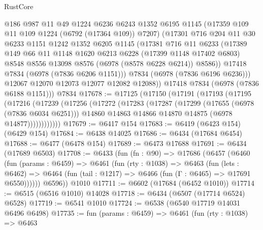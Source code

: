 \begin{lexlean}{RustCore}
\begin{coremodule}
            @186
            @987
            @11
            @49
            @1224
            @6236
            @6243
            @1352
            @6195
            @1145
            (@17359 @109 @11 @109 @1224 (@6792 (@17364 @109)) @7207)
            (@17301
              @716
              @204
              @11
              @30
              @6233
              @1151
              @1242
              @1352
              @6205
              @1145
              (@17381
                @716
                @11
                @6233
                (@17389
                  @149
                  @66
                  @11
                  @1148
                  @1620
                  @6213
                  @6228
                  (@17399 @1148 @17402 @6803)
                  @8548
                  @8556
                  @13098
                  @8576
                  (@6978 (@8578 @6228 @6214))
                  @8586))
              @17418
              @7834
              (@6978 (@7836 @6206 @1151)))
            @7834
            (@6978 (@7836 @6196 @6236)))
          @12067
          @12070
          @12073
          @12077
          @12082
          @12088))
      @17418
      @7834
      (@6978 (@7836 @6188 @1151)))
    @7834
@17678 := @17125
    (@17150
      (@17191
        (@17193
          (@17195
            (@17216
              (@17239
                (@17256
                  (@17272
                    (@17283
                      (@17287
                        (@17299
                          (@17655 (@6978 (@7836 @6034 @6251)))
                          @14860
                          @14863
                          @14866
                          @14870
                          @14875
                          (@6978 @14877))))))))))))
@17679 := @6417 @154
@17683 := @6419 (@6423 @154) (@6429 @154)
@17684 := @6438 @14025
@17686 := @6434 (@17684 @6454)
@17688 := @6477 (@6478 @154)
@17689 := @6473 @17688
@17691 := @6434 (@17689 @6503)
@17708 := @6433
    (fun (fn : @90) =>
    @17686
      (@6457
        (@6460
          (fun (params : @6459) =>
          @6461
            (fun (rty : @1038) =>
            @6463
              (fun (lets : @6462) =>
              @6464 (fun (tail : @1217) => @6466 (fun (Γ : @6465) => @17691 @6550))))))
        @6596))
    @1010
@17711 := @6602 (@17684 (@6452 @1010))
@17714 := @6515 (@6516 @1010) @14028
@17718 := @6434 (@6507 (@17714 @6524) @6528)
@17719 := @6541 @1010
@17724 := @6538 (@6540 @17719 @14031 @6496 @6498)
@17735 := fun (params : @6459) =>
  @6461
    (fun (rty : @1038) =>
    @6463

\end{coremodule}
\end{lexlean}
